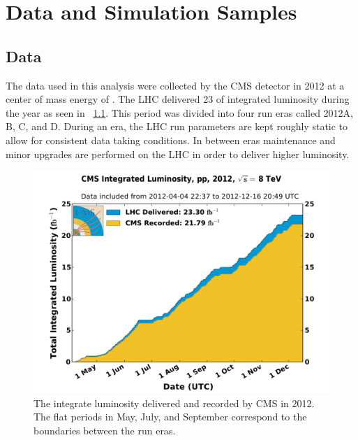 \chapter{Data and Simulation Samples}
\label{chatper:data_and_mc_samples}

\section{Data}

The data used in this analysis were collected by the CMS detector in 2012 at a
center of mass energy of \rootseight. The LHC delivered 23 \fbinv of integrated
luminosity during the year as seen in \FIG~\ref{fig:2012_luminosity}. This
period was divided into four run eras called 2012A, B, C, and D. During an era,
the LHC run parameters are kept roughly static to allow for consistent data
taking conditions. In between eras maintenance and minor upgrades are
performed on the LHC in order to deliver higher luminosity.

\begin{figure}[!htbp]
    \centering
    \includegraphics[width=\textwidth]{figures/2012_lumi.pdf}
    \caption[
        The integrate luminosity delivered and recorded by CMS in 2012
    ]{
        The integrate luminosity delivered and recorded by CMS in 2012. The
        flat periods in May, July, and September correspond to the boundaries
        between the run eras.
    }
    \label{fig:2012_luminosity}
\end{figure}

